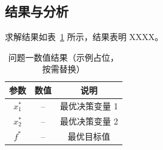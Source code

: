 \subsection{结果与分析}
求解结果如表~\ref{tab:result1} 所示，结果表明 XXXX。

\begin{table}[H]
    \centering
    \caption{问题一数值结果（示例占位，按需替换）}
    \label{tab:result1}
    \begin{tabular}{@{}ccc@{}}
        \toprule
        参数 & 数值 & 说明 \\
        \midrule
        $x_1^*$ & -- & 最优决策变量 1 \\
        $x_2^*$ & -- & 最优决策变量 2 \\
        $f^*$   & -- & 最优目标值 \\
        \bottomrule
    \end{tabular}
\end{table}

